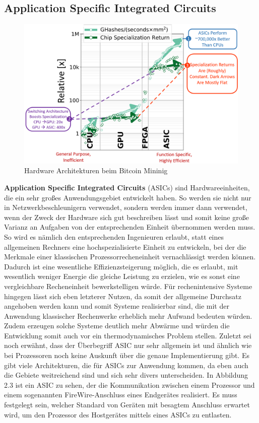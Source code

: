 \subsection{Application Specific Integrated Circuits}
\begin{figure}
    \centering
    \includegraphics[width=0.7\linewidth]{images/aisic.png}
    \caption{Hardware Architekturen beim Bitcoin Mininig \cite{bitcoin}}
    \label{fig:enter-label}
\end{figure}
\textbf{Application Specific Integrated Circuits} (ASICs) sind Hardwareeinheiten, die ein sehr großes Anwendungsgebiet entwickelt haben. So werden sie nicht nur in Netzwerkbeschleunigern verwendet, sondern werden immer dann verwendet, wenn der Zweck der Hardware sich gut beschreiben lässt und somit keine große Varianz an Aufgaben von der entsprechenden Einheit übernommen werden muss. So wird es nämlich den entsprechenden Ingenieuren erlaubt, statt eines allgemeinen Rechners eine hochspezialisierte Einheit zu entwickeln, bei der die Merkmale einer klassischen Prozessorrecheneinheit vernachlässigt werden können. Dadurch ist eine wesentliche Effizienzsteigerung möglich, die es erlaubt, mit wesentlich weniger Energie die gleiche Leistung zu erzielen, wie es sonst eine vergleichbare Recheneinheit bewerkstelligen würde\cite{asic}. Für rechenintensive Systeme hingegen lässt sich eben letzterer Nutzen, da somit der allgemeine Durchsatz angehoben werden kann und somit Systeme realisierbar sind, die mit der Anwendung klassischer Rechenwerke erheblich mehr Aufwand bedeuten würden. Zudem erzeugen solche Systeme deutlich mehr Abwärme und würden die Entwicklung somit auch vor ein thermodynamisches Problem stellen. Zuletzt sei noch erwähnt, dass der Überbegriff ASIC nur sehr allgemein ist und ähnlich wie bei Prozessoren noch keine Auskunft über die genaue Implementierung gibt. Es gibt viele Architekturen, die für ASICs zur Anwendung kommen, da eben auch die Gebiete weitreichend sind und sich sehr divers unterscheiden. In Abbildung 2.3 ist ein ASIC zu sehen, der die Kommunikation zwischen einem Prozessor und einem sogenannten FireWire-Anschluss eines Endgerätes realisiert. Es muss festgelegt sein, welcher Standard von Geräten mit besagtem Anschluss erwartet wird, um den Prozessor des Hostgerätes mittels eines ASICs zu entlasten.
\newline

